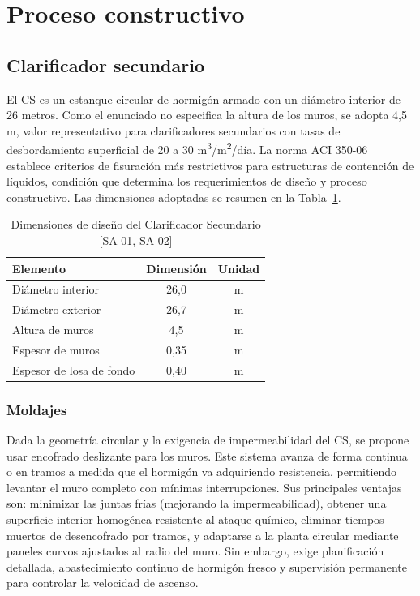 \section{Proceso constructivo}

\subsection{Clarificador secundario}

El CS es un estanque circular de hormigón armado con un diámetro interior de 26 metros. Como el enunciado no especifica la altura de los muros, se adopta 4{,}5 m, valor representativo para clarificadores secundarios con tasas de desbordamiento superficial de 20 a 30 m\textsuperscript{3}/m\textsuperscript{2}/día. La norma ACI 350-06 \cite{ACI350} establece criterios de fisuración más restrictivos para estructuras de contención de líquidos, condición que determina los requerimientos de diseño y proceso constructivo. Las dimensiones adoptadas se resumen en la Tabla~\ref{tab:cs_dim}.

\begin{table}[H]
  \centering
  \caption{Dimensiones de diseño del Clarificador Secundario \textnormal{[SA-01, SA-02]}}
  \label{tab:cs_dim}
  \begin{tabular}{lcc}
    \toprule
    Elemento                 & Dimensión & Unidad \\
    \midrule
    Diámetro interior        & 26{,}0    & m \\
    Diámetro exterior        & 26{,}7    & m \\
    Altura de muros          & 4{,}5     & m \\
    Espesor de muros         & 0{,}35    & m \\
    Espesor de losa de fondo & 0{,}40    & m \\
    \bottomrule
  \end{tabular}
\end{table}

\subsubsection{Moldajes}

Dada la geometría circular y la exigencia de impermeabilidad del CS, se propone usar encofrado deslizante para los muros. Este sistema avanza de forma continua o en tramos a medida que el hormigón va adquiriendo resistencia, permitiendo levantar el muro completo con mínimas interrupciones. Sus principales ventajas son: minimizar las juntas frías (mejorando la impermeabilidad), obtener una superficie interior homogénea resistente al ataque químico, eliminar tiempos muertos de desencofrado por tramos, y adaptarse a la planta circular mediante paneles curvos ajustados al radio del muro. Sin embargo, exige planificación detallada, abastecimiento continuo de hormigón fresco y supervisión permanente para controlar la velocidad de ascenso.

